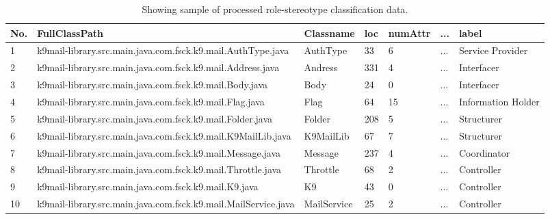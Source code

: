 \documentclass[AMA,Times1COL]{WileyNJDv5} %
\begin{document}
	\begin{table}[h]
		\centering %
		\caption{Showing sample of processed role-stereotype classification data.} %
		\begin{tabular*}{\textwidth}{@{\extracolsep\fill}lllllll@{\extracolsep\fill}}%

				\toprule
			\textbf{No.}& \textbf{FullClassPath} & \textbf{Classname} & \textbf{loc} &\textbf{numAttr} & \textbf{...} & \textbf{label} \\ 
			\midrule %
			1 & k9mail-library.src.main.java.com.fsck.k9.mail.AuthType.java & AuthType & 33 & 6 & ... & Service Provider\\ %
			2 & k9mail-library.src.main.java.com.fsck.k9.mail.Address.java & Andress & 331 & 4 & ... & Interfacer \\
			3 & k9mail-library.src.main.java.com.fsck.k9.mail.Body.java & Body & 24 & 0 & ... & Interfacer\\
			4 & k9mail-library.src.main.java.com.fsck.k9.mail.Flag.java& Flag & 64 & 15 & ... & Information Holder\\ 
			5 & k9mail-library.src.main.java.com.fsck.k9.mail.Folder.java & Folder & 208 & 5 & ... & Structurer\\
			6 & k9mail-library.src.main.java.com.fsck.k9.mail.K9MailLib.java & K9MailLib & 67 & 7 & ... & Structurer\\
			7 & k9mail-library.src.main.java.com.fsck.k9.mail.Message.java & Message & 237 & 4 & ... & Coordinator\\
			8 &k9mail-library.src.main.java.com.fsck.k9.mail.Throttle.java & Throttle & 68 & 2 & ... & Controller \\
			9 & k9mail-library.src.main.java.com.fsck.k9.mail.K9.java & K9 & 43 & 0 & ... & Controller \\ 
			10 & k9mail-library.src.main.java.com.fsck.k9.mail.MailService.java & MailService & 25 & 2 & ... & Controller\\  %
			\bottomrule
		\end{tabular*}
		\label{table:rs_sample} %
	\end{table}
	
\end{document}

